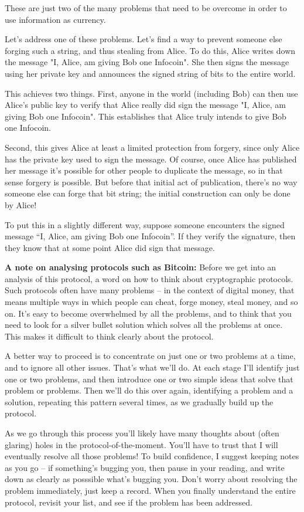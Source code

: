 \documentclass[12pt]{book}
\newcounter{problem}[chapter]
\begin{document}
These are just two of the many problems that need to be overcome in
order to use information as currency.

Let's address one of these problems.  Let's find a way to prevent
someone else forging such a string, and thus stealing from Alice.  To
do this, Alice writes down the message "I, Alice, am giving Bob one
Infocoin".  She then signs the message using her private key and
announces the signed string of bits to the entire world.

This achieves two things.  First, anyone in the world (including Bob)
can then use Alice's public key to verify that Alice really did sign
the message "I, Alice, am giving Bob one Infocoin".  This establishes
that Alice truly intends to give Bob one Infocoin.

Second, this gives Alice at least a limited protection from forgery,
since only Alice has the private key used to sign the message.  Of
course, once Alice has published her message it's possible for other
people to duplicate the message, so in that sense forgery is possible.
But before that initial act of publication, there's no way someone
else can forge that bit string; the initial construction can only be
done by Alice!  

To put this in a slightly different way, suppose someone encounters
the signed message ``I, Alice, am giving Bob one Infocoin''.  If they
verify the signature, then they know that at some point Alice did sign
that message.

\textbf{A note on analysing protocols such as Bitcoin:} Before we get
into an analysis of this protocol, a word on how to think about
cryptographic protocols.  Such protocols often have many problems --
in the context of digital money, that means multiple ways in which
people can cheat, forge money, steal money, and so on.  It's easy to
become overwhelmed by all the problems, and to think that you need to
look for a silver bullet solution which solves all the problems at
once.  This makes it difficult to think clearly about the protocol.

A better way to proceed is to concentrate on just one or two problems
at a time, and to ignore all other issues.  That's what we'll do.  At
each stage I'll identify just one or two problems, and then introduce
one or two simple ideas that solve that problem or problems.  Then
we'll do this over again, identifying a problem and a solution,
repeating this pattern several times, as we gradually build up the
protocol.

As we go through this process you'll likely have many thoughts about
(often glaring) holes in the protocol-of-the-moment.  You'll have to
trust that I will eventually resolve all those problems!  To build
confidence, I suggest keeping notes as you go -- if something's
bugging you, then pause in your reading, and write down as clearly as
posssible what's bugging you.  Don't worry about resolving the problem
immediately, just keep a record.  When you finally understand the
entire protocol, revisit your list, and see if the problem has been
addressed.
\end{document}
